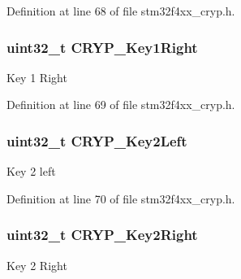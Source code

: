 Definition at line 68 of file stm32f4xx\-\_\-cryp.\-h.

\hypertarget{struct_c_r_y_p___key_init_type_def_a09997dd36e6eeefbf46059c3d93b91ac}{
\subsubsection[{C\-R\-Y\-P\-\_\-\-Key1\-Right}]{\setlength{\rightskip}{0pt plus 5cm}uint32\-\_\-t C\-R\-Y\-P\-\_\-\-Key1\-Right}}\label{struct_c_r_y_p___key_init_type_def_a09997dd36e6eeefbf46059c3d93b91ac}
Key 1 Right 

Definition at line 69 of file stm32f4xx\-\_\-cryp.\-h.

\hypertarget{struct_c_r_y_p___key_init_type_def_a132c3310aa310d86aad98d277af3089f}{
\subsubsection[{C\-R\-Y\-P\-\_\-\-Key2\-Left}]{\setlength{\rightskip}{0pt plus 5cm}uint32\-\_\-t C\-R\-Y\-P\-\_\-\-Key2\-Left}}\label{struct_c_r_y_p___key_init_type_def_a132c3310aa310d86aad98d277af3089f}
Key 2 left 

Definition at line 70 of file stm32f4xx\-\_\-cryp.\-h.

\hypertarget{struct_c_r_y_p___key_init_type_def_acada4f6eb7839b407f6cd197cf891f17}{
\subsubsection[{C\-R\-Y\-P\-\_\-\-Key2\-Right}]{\setlength{\rightskip}{0pt plus 5cm}uint32\-\_\-t C\-R\-Y\-P\-\_\-\-Key2\-Right}}\label{struct_c_r_y_p___key_init_type_def_acada4f6eb7839b407f6cd197cf891f17}
Key 2 Right 

